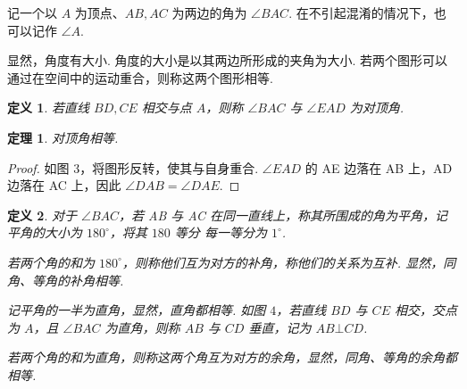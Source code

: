 \documentclass[a4paper]{article}
\newtheorem{theorem}{定理}[section]
\newtheorem{definition}{定义}[section]
\begin{document}
记一个以 $A$ 为顶点、$AB,AC$ 为两边的角为 $\angle BAC$. 在不引起混淆的情况下，也可以记作 $\angle A$.

显然，角度有大小. 角度的大小是以其两边所形成的夹角为大小. 若两个图形可以通过在空间中的运动重合，则称这两个图形相等.

\begin{definition}
    若直线 $BD,CE$ 相交与点 $A$，则称 $\angle BAC$ 与 $\angle EAD$ 为对顶角.
\end{definition}

\begin{theorem}
    对顶角相等.
\end{theorem}

\begin{proof}
    如图 $3$，将图形反转，使其与自身重合. $\angle EAD$ 的 AE 边落在 AB 上，AD 边落在 AC 上，因此 $\angle DAB
        =\angle DAE$.
\end{proof}

\begin{definition}
    对于 $\angle BAC$，若 AB 与 AC 在同一直线上，称其所围成的角为平角，记平角的大小为 $180^\circ$，将其 $180$ 等分
    每一等分为 $1^\circ$.

    若两个角的和为 $180^\circ$，则称他们互为对方的补角，称他们的关系为互补. 显然，同角、等角的补角相等.

    记平角的一半为直角，显然，直角都相等. 如图 $4$，若直线 $BD$ 与 $CE$ 相交，交点为 $A$，且 $\angle BAC$ 为直角，则称 $AB$ 与 $CD$ 垂直，记为
    $AB\bot CD$.

    若两个角的和为直角，则称这两个角互为对方的余角，显然，同角、等角的余角都相等.
\end{definition}
\end{document}
